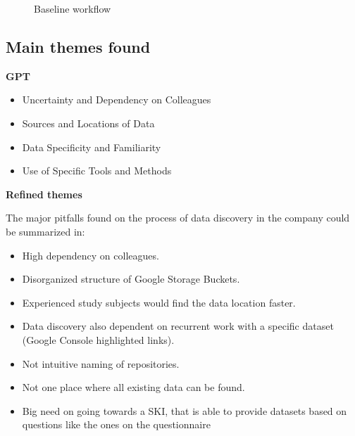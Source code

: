 \documentclass[
  oneside,
  open=any]{scrbook}
\providecommand{\tightlist}{%
  \setlength{\itemsep}{0pt}\setlength{\parskip}{0pt}}\usepackage{longtable,booktabs,array}
\begin{document}
\begin{figure}[H]


\caption{\label{fig-baseline}Baseline workflow}

\end{figure}%

\subsection{Main themes found}\label{main-themes-found}

\textbf{GPT}

\begin{itemize}
\tightlist
\item
  Uncertainty and Dependency on Colleagues
\item
  Sources and Locations of Data
\item
  Data Specificity and Familiarity
\item
  Use of Specific Tools and Methods
\end{itemize}

\textbf{Refined themes}

The major pitfalls found on the process of data discovery in the company
could be summarized in:

\begin{itemize}
\tightlist
\item
  High dependency on colleagues.
\item
  Disorganized structure of Google Storage Buckets.
\item
  Experienced study subjects would find the data location faster.
\item
  Data discovery also dependent on recurrent work with a specific
  dataset (Google Console highlighted links).
\item
  Not intuitive naming of repositories.
\item
  Not one place where all existing data can be found.
\item
  Big need on going towards a SKI, that is able to provide datasets
  based on questions like the ones on the questionnaire
\end{itemize}
\end{document}
